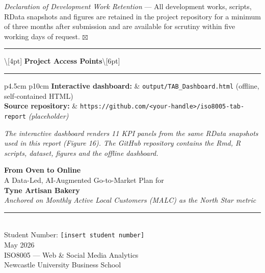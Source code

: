 \documentclass[
  11pt,
]{article}
\begin{document}
\textit{Declaration of Development Work Retention} --- All development
works, scripts, RData snapshots and figures are retained in the project
repository for a minimum of three months after submission and are
available for scrutiny within five working days of request.
\hfill \(\boxtimes\)

\vspace{1.2cm}
\rule{\linewidth}{0.4pt}

\textbackslash{[}4pt{]}
\textbf{Project Access Points}\textbackslash{[}6pt{]}

\rule{\linewidth}{0.4pt}

\begin{tabular}{p{4.5cm} p{10cm}}
\textbf{Interactive dashboard:} & \texttt{output/TAB\_Dashboard.html} (offline, self-contained HTML) \\
\textbf{Source repository:}     & \texttt{https://github.com/<your-handle>/iso8005-tab-report} \emph{(placeholder)} \\
\end{tabular}

\vspace{0.4cm}

\small \emph{The interactive dashboard renders 11 KPI panels from the same RData snapshots used in this report (Figure 16). The GitHub repository contains the Rmd, R scripts, dataset, figures and the offline dashboard.}

\newpage

\thispagestyle{empty}
\begin{center}
\vspace*{2cm}
{\LARGE \textbf{From Oven to Online}}\\[10pt]
{\Large A Data-Led, AI-Augmented Go-to-Market Plan for}\\[4pt]
{\Large \textbf{Tyne Artisan Bakery}}\\[18pt]
{\large \emph{Anchored on Monthly Active Local Customers (MALC) as the North Star metric}}\\[24pt]
\rule{0.6\linewidth}{0.4pt}\\[14pt]
{\large Student Number: \texttt{[insert student number]}}\\[6pt]
{\large May 2026}\\[6pt]
{\normalsize ISO8005 --- Web \& Social Media Analytics}\\
{\normalsize Newcastle University Business School}
\end{center}
\vfill

\newpage
\end{document}

